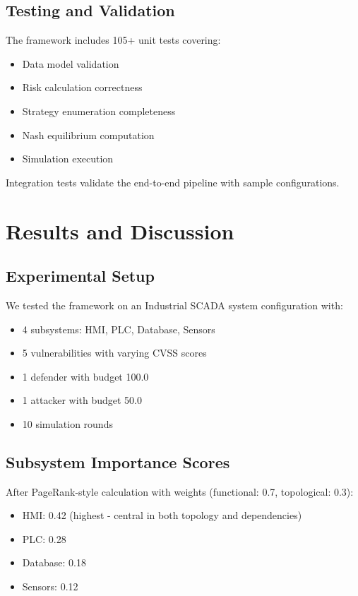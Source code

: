 \documentclass[conference]{IEEEtran}
\begin{document}
\subsection{Testing and Validation}
The framework includes 105+ unit tests covering:
\begin{itemize}
    \item Data model validation
    \item Risk calculation correctness
    \item Strategy enumeration completeness
    \item Nash equilibrium computation
    \item Simulation execution
\end{itemize}

Integration tests validate the end-to-end pipeline with sample configurations.

\section{Results and Discussion}

\subsection{Experimental Setup}
We tested the framework on an Industrial SCADA system configuration with:
\begin{itemize}
    \item 4 subsystems: HMI, PLC, Database, Sensors
    \item 5 vulnerabilities with varying CVSS scores
    \item 1 defender with budget 100.0
    \item 1 attacker with budget 50.0
    \item 10 simulation rounds
\end{itemize}

\subsection{Subsystem Importance Scores}
After PageRank-style calculation with weights (functional: 0.7, topological: 0.3):
\begin{itemize}
    \item HMI: 0.42 (highest - central in both topology and dependencies)
    \item PLC: 0.28
    \item Database: 0.18
    \item Sensors: 0.12
\end{itemize}
\end{document}
